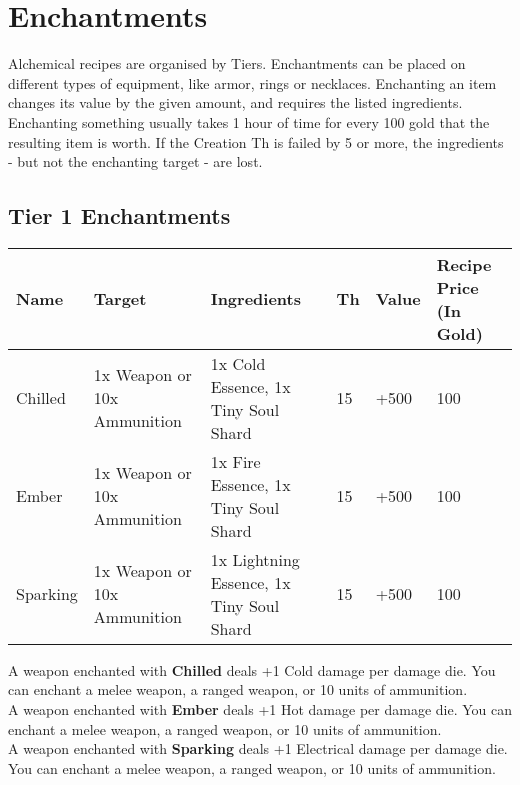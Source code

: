 \section{Enchantments}\label{sec:enchantments}
Alchemical recipes are organised by Tiers.
Enchantments can be placed on different types of equipment, like armor, rings or necklaces.
Enchanting an item changes its value by the given amount, and requires the listed ingredients.
Enchanting something usually takes 1 hour of time for every 100 gold that the resulting item is worth.
If the Creation Th is failed by 5 or more, the ingredients - but not the enchanting target - are lost.\\


\subsection{Tier 1 Enchantments}
\begin{longtable}{l | p{2.5cm} | p{2.5cm}| l | l | l }
	Name & Target & Ingredients & Th & Value & Recipe Price (In Gold)\\ \hline
	Chilled & 1x Weapon or 10x Ammunition & 1x Cold Essence, 1x Tiny Soul Shard & 15 & +500 & 100\\
	Ember & 1x Weapon or 10x Ammunition & 1x Fire Essence, 1x Tiny Soul Shard & 15 & +500 & 100\\
	Sparking & 1x Weapon or 10x Ammunition & 1x Lightning Essence, 1x Tiny Soul Shard & 15 & +500 & 100\\
\end{longtable}

A weapon enchanted with \textbf{Chilled} deals +1 Cold damage per damage die.
You can enchant a melee weapon, a ranged weapon, or 10 units of ammunition.\\

A weapon enchanted with \textbf{Ember} deals +1 Hot damage per damage die.
You can enchant a melee weapon, a ranged weapon, or 10 units of ammunition.\\

A weapon enchanted with \textbf{Sparking} deals +1 Electrical damage per damage die.
You can enchant a melee weapon, a ranged weapon, or 10 units of ammunition.\\
